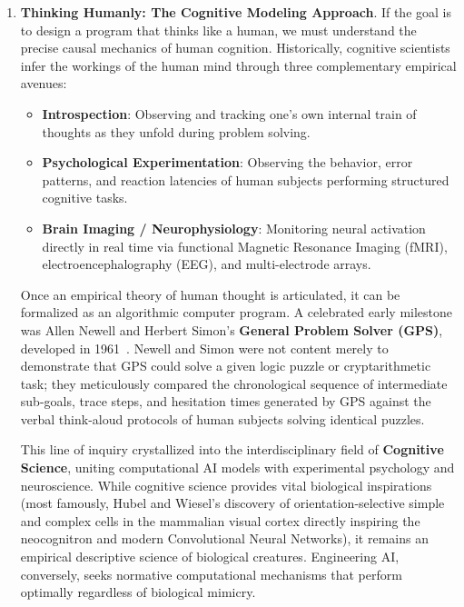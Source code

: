 \begin{enumerate}
  Despite its historical brilliance, modern AI researchers have largely abandoned the Turing Test as a primary research goal. Russell and Norvig draw an insightful analogy to \textbf{aeronautical engineering}: aeronautical texts do not define the goal of their discipline as building ``machines that fly so exactly like pigeons that they can fool even other pigeons.'' The field of aviation succeeded only when engineers ceased attempting to flap feathers and instead developed wind tunnels to understand the fundamental physics of \textbf{aerodynamics}. Similarly, artificial intelligence focuses on discovering the underlying mathematical principles of rational agency, rather than copying human cognitive flaws, reaction delays, or biological deceptions.

  \item \textbf{Thinking Humanly: The Cognitive Modeling Approach}.
  If the goal is to design a program that thinks like a human, we must understand the precise causal mechanics of human cognition. Historically, cognitive scientists infer the workings of the human mind through three complementary empirical avenues:
  \begin{itemize}[noitemsep]
    \item \textbf{Introspection}: Observing and tracking one's own internal train of thoughts as they unfold during problem solving.
    \item \textbf{Psychological Experimentation}: Observing the behavior, error patterns, and reaction latencies of human subjects performing structured cognitive tasks.
    \item \textbf{Brain Imaging / Neurophysiology}: Monitoring neural activation directly in real time via functional Magnetic Resonance Imaging (fMRI), electroencephalography (EEG), and multi-electrode arrays.
  \end{itemize}
  Once an empirical theory of human thought is articulated, it can be formalized as an algorithmic computer program. A celebrated early milestone was Allen Newell and Herbert Simon's \textbf{General Problem Solver (GPS)}, developed in 1961~\cite{newell1961gps}. Newell and Simon were not content merely to demonstrate that GPS could solve a given logic puzzle or cryptarithmetic task; they meticulously compared the chronological sequence of intermediate sub-goals, trace steps, and hesitation times generated by GPS against the verbal think-aloud protocols of human subjects solving identical puzzles.
  
  This line of inquiry crystallized into the interdisciplinary field of \textbf{Cognitive Science}, uniting computational AI models with experimental psychology and neuroscience. While cognitive science provides vital biological inspirations (most famously, Hubel and Wiesel's discovery of orientation-selective simple and complex cells in the mammalian visual cortex directly inspiring the neocognitron and modern Convolutional Neural Networks), it remains an empirical descriptive science of biological creatures. Engineering AI, conversely, seeks normative computational mechanisms that perform optimally regardless of biological mimicry.


\end{enumerate}
